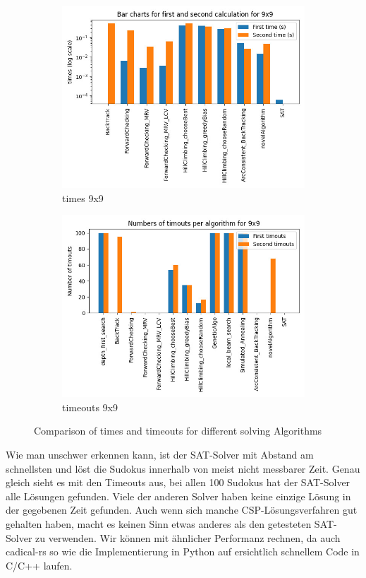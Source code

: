     \begin{figure}[t]
        \centering
        
        \begin{subfigure}[b]{0.8\textwidth}
            \includegraphics[width=\textwidth]{data/times_9x9}
            \caption{times 9x9}
        \end{subfigure}
        \hfill
        \begin{subfigure}[b]{0.8\textwidth}
            \includegraphics[width=\linewidth]{data/timeouts_9x9}
            \caption{timeouts 9x9}
        \end{subfigure}
        
        \caption{Comparison of times and timeouts for different solving Algorithms}
    \end{figure}

Wie man unschwer erkennen kann, ist der SAT-Solver mit Abstand am schnellsten und löst die Sudokus innerhalb von meist nicht messbarer Zeit. 
Genau gleich sieht es mit den Timeouts aus, bei allen 100 Sudokus hat der SAT-Solver alle Lösungen gefunden. Viele der anderen Solver haben keine einzige Lösung in der gegebenen Zeit gefunden.
Auch wenn sich manche CSP-Lösungsverfahren gut gehalten haben, macht es keinen Sinn etwas anderes als den getesteten SAT-Solver zu verwenden.
Wir können mit ähnlicher Performanz rechnen, da auch cadical-rs so wie die Implementierung in Python auf ersichtlich schnellem Code in C/C++ laufen.
